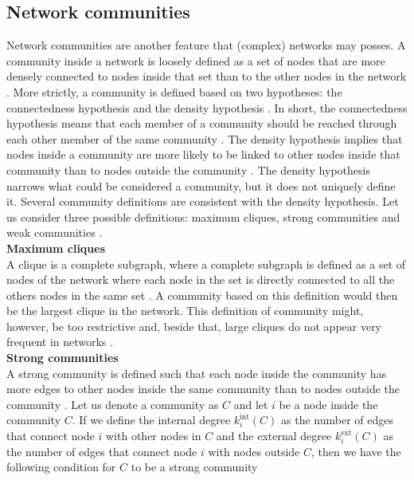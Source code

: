 \documentclass[11 pt , letterpaper , twoside , openright]{book}
\begin{document}
\subsection{Network communities}

Network communities are another feature that (complex) networks may posses. A community inside a network is loosely defined as a set of nodes that are more densely connected to nodes inside that set than to the other nodes in the network \cite{Saha2015}. More strictly, a community is defined based on two hypotheses: the connectedness hypothesis and the density hypothesis \cite{Albert2016}. In short, the connectedness hypothesis means that each member of a community should be reached through each other member of the same community \cite{Albert2016}. The density hypothesis implies that nodes inside a community are more likely to be linked to other nodes inside that community than to nodes outside the community \cite{Albert2016}. The density hypothesis narrows what could be considered a community, but it does not uniquely define it. Several community definitions are consistent with the density hypothesis. Let us consider three possible definitions: maximum cliques, strong communities and weak communities \cite{Albert2016}.\\
\newpage
\noindent
\textbf{Maximum cliques}\\
\newline
A clique is a complete subgraph, where a complete subgraph is defined as a set of nodes of the network where each node in the set is directly connected to all the others nodes in the same set \cite{Albert2016}. A community based on this definition would then be the largest clique in the network. This definition of community might, however, be too restrictive and, beside that, large cliques do not appear very frequent in networks \cite{Albert2016}.\\   
\newline
\textbf{Strong communities}\\
\newline
A strong community is defined such that each node inside the community has more edges to other nodes inside the same community than to nodes outside the community \cite{Albert2016}\cite{F.Costa2007}. Let us denote a community as $C$ and let $i$ be a node inside the community $C$. If we define the internal degree $k_i^{\textrm{int}}(C)$ as the number of edges that connect node $i$ with other nodes in $C$ and the external degree $k_i^{\textrm{ext}}(C)$ as the number of edges that connect node $i$ with nodes outside $C$, then we have the following condition for $C$ to be a strong community \cite{Albert2016}
\end{document}
